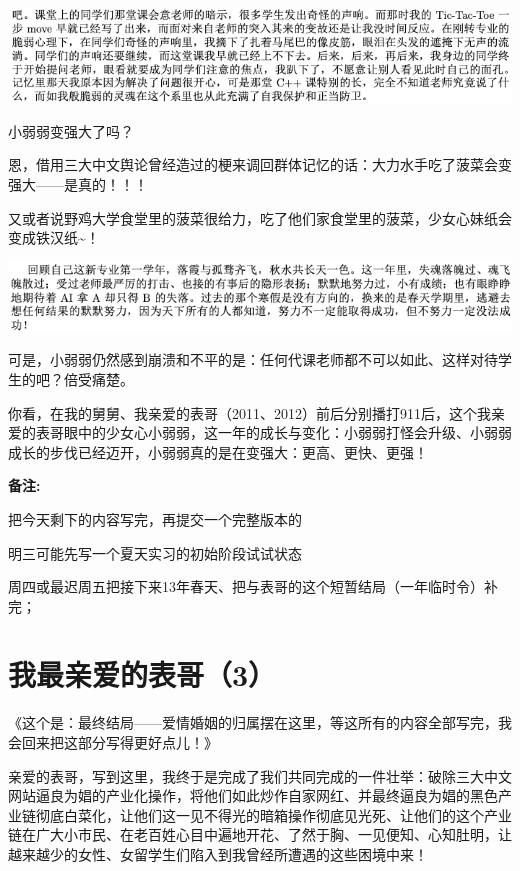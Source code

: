 \documentclass[9pt, b5paper]{article}
\begin{document}
\begin{center}
\includegraphics[width=.9\linewidth]{./pic/backups_plans_20210501_214449.png}
\end{center}

小弱弱变强大了吗？

恩，借用三大中文舆论曾经造过的梗来调回群体记忆的话：大力水手吃了菠菜会变强大——是真的！！！

又或者说野鸡大学食堂里的菠菜很给力，吃了他们家食堂里的菠菜，少女心妹纸会变成铁汉纸\textasciitilde{}！

\begin{center}
\includegraphics[width=.9\linewidth]{./pic/backups_plans_20210501_225803.png}
\end{center}

可是，小弱弱仍然感到崩溃和不平的是：任何代课老师都不可以如此、这样对待学生的吧？倍受痛楚。 

你看，在我的舅舅、我亲爱的表哥（2011、2012）前后分别播打911后，这个我亲爱的表哥眼中的少女心小弱弱，这一年的成长与变化：小弱弱打怪会升级、小弱弱成长的步伐已经迈开，小弱弱真的是在变强大：更高、更快、更强！

\textbf{备注:} 

把今天剩下的内容写完，再提交一个完整版本的

明三可能先写一个夏天实习的初始阶段试试状态

周四或最迟周五把接下来13年春天、把与表哥的这个短暂结局（一年临时令）补完；


\section{我最亲爱的表哥（3）}
\label{sec:org594cbfd}

《这个是：最终结局——爱情婚姻的归属摆在这里，等这所有的内容全部写完，我会回来把这部分写得更好点儿！》

亲爱的表哥，写到这里，我终于是完成了我们共同完成的一件壮举：破除三大中文网站逼良为娼的产业化操作，将他们如此炒作自家网红、并最终逼良为娼的黑色产业链彻底白菜化，让他们这一见不得光的暗箱操作彻底见光死、让他们的这个产业链在广大小市民、在老百姓心目中遍地开花、了然于胸、一见便知、心知肚明，让越来越少的女性、女留学生们陷入到我曾经所遭遇的这些困境中来！
\end{document}
